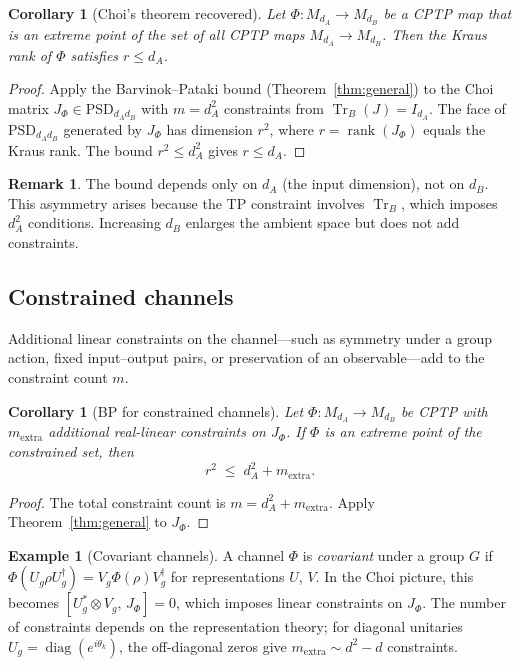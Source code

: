 \documentclass[11pt,a4paper]{article}
\newtheorem{corollary}[theorem]{Corollary}
\theoremstyle{definition}
\newtheorem{remark}[theorem]{Remark}
\newtheorem{example}[theorem]{Example}
\newcommand{\rank}{\operatorname{rank}}
\newcommand{\PSD}{\mathrm{PSD}}
\newcommand{\Tr}{\operatorname{Tr}}
\begin{document}
\begin{corollary}[Choi's theorem recovered]\label{cor:choi}
Let $\Phi \colon M_{d_A} \to M_{d_B}$ be a CPTP map that is an
extreme point of the set of all CPTP maps $M_{d_A} \to M_{d_B}$.
Then the Kraus rank of $\Phi$ satisfies $r \leq d_A$.
\end{corollary}

\begin{proof}
Apply the Barvinok--Pataki bound (Theorem~\ref{thm:general}) to the
Choi matrix $J_\Phi \in \PSD_{d_A d_B}$ with $m = d_A^2$ constraints
from $\Tr_B(J) = I_{d_A}$.  The face of $\PSD_{d_A d_B}$ generated by
$J_\Phi$ has dimension $r^2$, where $r = \rank(J_\Phi)$ equals the
Kraus rank.  The bound $r^2 \leq d_A^2$ gives $r \leq d_A$.
\end{proof}

\begin{remark}
The bound depends only on $d_A$ (the input dimension), not on $d_B$.
This asymmetry arises because the TP constraint involves $\Tr_B$,
which imposes $d_A^2$ conditions.  Increasing $d_B$ enlarges the
ambient space but does not add constraints.
\end{remark}

\subsection{Constrained channels}
\label{sec:constrained-channels}

Additional linear constraints on the channel---such as symmetry
under a group action, fixed input--output pairs, or preservation of
an observable---add to the constraint count $m$.

\begin{corollary}[BP for constrained channels]\label{cor:constrained-channel}
Let $\Phi \colon M_{d_A} \to M_{d_B}$ be CPTP with $m_{\mathrm{extra}}$
additional real-linear constraints on $J_\Phi$.  If $\Phi$ is an extreme
point of the constrained set, then
\[
  r^2 \;\leq\; d_A^2 + m_{\mathrm{extra}}.
\]
\end{corollary}

\begin{proof}
The total constraint count is $m = d_A^2 + m_{\mathrm{extra}}$.
Apply Theorem~\ref{thm:general} to $J_\Phi$.
\end{proof}

\begin{example}[Covariant channels]
A channel $\Phi$ is \emph{covariant} under a group $G$ if
$\Phi(U_g \rho U_g^\dagger) = V_g \Phi(\rho) V_g^\dagger$ for
representations $U$, $V$.  In the Choi picture, this becomes
$[U_g^* \otimes V_g,\, J_\Phi] = 0$, which imposes linear constraints
on $J_\Phi$.  The number of constraints depends on the representation
theory; for diagonal unitaries $U_g = \operatorname{diag}(e^{i\theta_k})$,
the off-diagonal zeros give $m_{\mathrm{extra}} \sim d^2 - d$ constraints.
\end{example}
\end{document}
